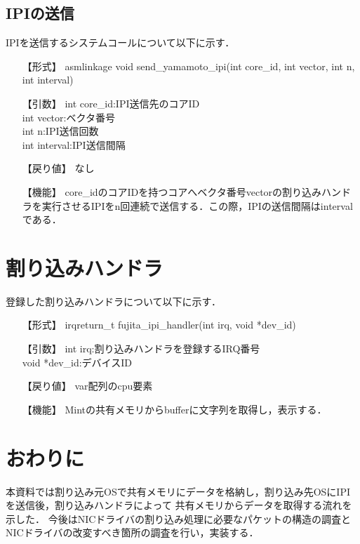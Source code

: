 \documentclass[12pt]{jsarticle}
\begin{document}
\subsection{IPIの送信}
IPIを送信するシステムコールについて以下に示す．
\begin{itemize}
\item [【形式】] asmlinkage void send\_yamamoto\_ipi(int core\_id, int vector, int n, int interval)
\item [【引数】] int core\_id:IPI送信先のコアID\\int vector:ベクタ番号\\int n:IPI送信回数\\int interval:IPI送信間隔
\item [【戻り値】] なし
\item [【機能】] core\_idのコアIDを持つコアへベクタ番号vectorの割り込みハンドラを実行させるIPIをn回連続で送信する．この際，IPIの送信間隔はintervalである．
\end{itemize}
\section{割り込みハンドラ}
登録した割り込みハンドラについて以下に示す．
\begin{itemize}
\item [【形式】] irqreturn\_t fujita\_ipi\_handler(int irq, void *dev\_id)
\item [【引数】] int irq:割り込みハンドラを登録するIRQ番号\\void *dev\_id:デバイスID
\item [【戻り値】] var配列のcpu要素
\item [【機能】] Mintの共有メモリからbufferに文字列を取得し，表示する．
\end{itemize}

\section{おわりに}
本資料では割り込み元OSで共有メモリにデータを格納し，割り込み先OSにIPIを送信後，割り込みハンドラによって
共有メモリからデータを取得する流れを示した．
今後はNICドライバの割り込み処理に必要なパケットの構造の調査とNICドライバの改変すべき箇所の調査を行い，実装する．
\end{document}
